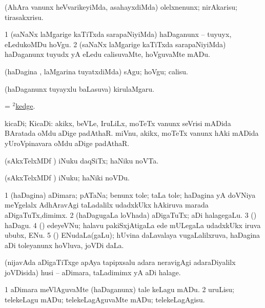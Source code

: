 \noindent
\gl{\pagu}
\bmng
{} (AhAra \mo vanunx heVvarikeyiMda, asahayxdiMda) olelxnenunx; nirAkarisu; tirasakxrisu. 
\emng
\eentry

\bentry
{}
\gl{\sakirx}
\bmng
\bnum
\num{1} (saNaNx laMgarige kaTiTxda sarapaNiyiMda) haDaganunx -- tuyuyx, eLedukoMDu hoVgu. 
\num{2} (saNaNx laMgarige kaTiTxda sarapaNiyiMda) haDaganunx tuyudx yA eLedu calisuvaMte, hoVguvaMte mADu. 
\enum
\emng

\noindent
\gl{\akirx}
\bmng
(haDagina \vi, laMgarina tuyatxdiMda) sAgu; hoVgu; calisu. 
\emng
\eentry

\bentry
{}
\gl{\nA}
\bmng
(haDaganunx tuyayxlu baLasuva) kirulaMgaru. 
\emng
\eentry

\bentry
{}
\gl{\nA}
\bmng
 = \hyperlink{kedge(2)}{$^2$kedge}. 
\emng
\eentry

\bentry
{}
\gl{\nA}
\bmng
kicaDi; KicaDi: 
\banum
{} akikx, beVLe, IruLiLx, moTeTx \mo vanunx seVrisi mADida BAratada oMdu aDige padAthaR. 
 miVnu, akikx, moTeTx \mo vanunx hAki mADida yUroVpinavara oMdu aDige padAthaR. 
\eanum
\emng
\eentry

\bentry
{}
\gl{\nA}
\bmng
(sAkxTelxMDf \parx) iNuku daqSiTx; haNiku noVTa. 
\emng
\eentry

\bentry
{}
\gl{\akirx}
\bmng
(sAkxTelxMDf \parx) iNuku; haNiki noVDu. 
\emng
\eentry

\bentry
{}
\gl{\nA}
\bmng
\bnum
\num{1} (haDagina) aDimara; pATaNa; benunx tole; taLa tole; haDagina yA doVNiya meYgelalx AdhAravAgi taLadalilx udadxkUkx hAkiruva marada aDigaTuTx,dimimx. 
\num{2} (haDagugaLa loVhada) aDigaTuTx; aDi halagegaLu. 
\num{3} (\kaparx) haDagu. 
\num{4} (\pArxvi) edeyeVNu; halavu pakiSxjAtigaLa ede mULegaLa udadxkUkx iruva ububx, ENu. 
\num{5} (\savi) ENudaLa(gaLu); hUvina daLavalaya \mo vugaLalilxruva, haDagina aDi toleyanunx hoVluva, joVDi daLa. 
\enum
\emng

\noindent
\gl{\pagu}
\bmng
{} (nijavAda aDigaTiTxge apAya tapipxsalu adara neravigAgi adaraDiyalilx joVDisida) husi -- aDimara, taLadimimx yA aDi halage. 
\emng
\eentry

\bentry
{}
\gl{\sakirx}
\bmng
\bnum
\num{1} aDimara meVlAguvaMte (haDaganunx) tale keLagu mADu. 
\hypertarget{keelsakirx(2)}{} 
\num{2} uruLisu; telekeLagu mADu; telekeLagAguvaMte mADu; telekeLagAgisu. 
\enum
\emng

